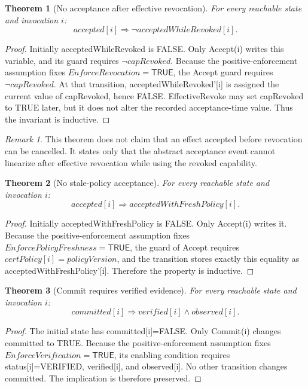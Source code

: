 \documentclass[11pt,a4paper]{article}
\newtheorem{theorem}{Theorem}[section]
\theoremstyle{remark}
\newtheorem{remark}{Remark}[section]
\begin{document}
\begin{theorem}[No acceptance after effective revocation]
For every reachable state and invocation $i$:
\[
accepted[i]\Rightarrow\neg acceptedWhileRevoked[i].
\]
\end{theorem}
\begin{proof}
Initially acceptedWhileRevoked is FALSE. Only Accept(i) writes this variable, and its guard requires $\neg capRevoked$. Because the positive-enforcement assumption fixes $EnforceRevocation=\mathsf{TRUE}$, the Accept guard requires $\neg capRevoked$. At that transition, acceptedWhileRevoked'[i] is assigned the current value of capRevoked, hence FALSE. EffectiveRevoke may set capRevoked to TRUE later, but it does not alter the recorded acceptance-time value. Thus the invariant is inductive.
\end{proof}

\begin{remark}
This theorem does not claim that an effect accepted before revocation can be cancelled. It states only that the abstract acceptance event cannot linearize after effective revocation while using the revoked capability.
\end{remark}

\begin{theorem}[No stale-policy acceptance]
For every reachable state and invocation $i$:
\[
accepted[i]\Rightarrow acceptedWithFreshPolicy[i].
\]
\end{theorem}
\begin{proof}
Initially acceptedWithFreshPolicy is FALSE. Only Accept(i) writes it. Because the positive-enforcement assumption fixes $EnforcePolicyFreshness=\mathsf{TRUE}$, the guard of Accept requires $certPolicy[i]=policyVersion$, and the transition stores exactly this equality as acceptedWithFreshPolicy'[i]. Therefore the property is inductive.
\end{proof}

\begin{theorem}[Commit requires verified evidence]
For every reachable state and invocation $i$:
\[
committed[i]\Rightarrow verified[i]\land observed[i].
\]
\end{theorem}
\begin{proof}
The initial state has committed[i]=FALSE. Only Commit(i) changes committed to TRUE. Because the positive-enforcement assumption fixes $EnforceVerification=\mathsf{TRUE}$, its enabling condition requires status[i]=VERIFIED, verified[i], and observed[i]. No other transition changes committed. The implication is therefore preserved.
\end{proof}
\end{document}
